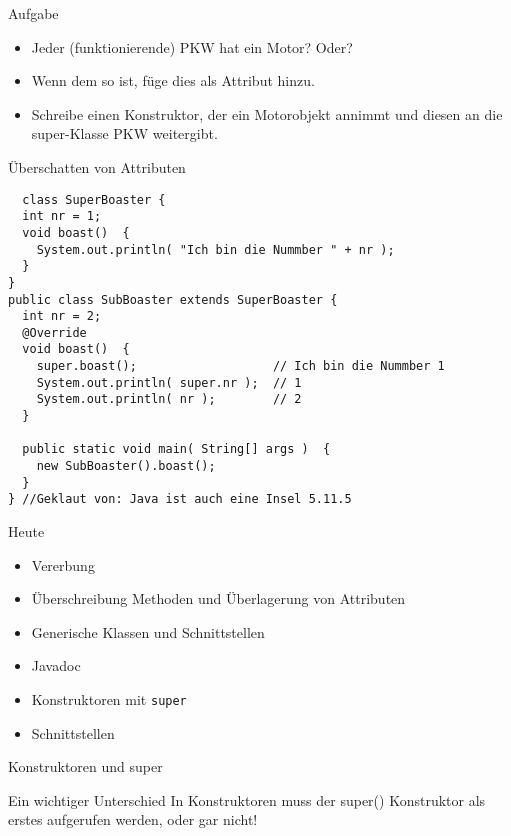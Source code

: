 \documentclass[18pt]{beamer}
\begin{document}
\begin{frame}{Aufgabe}
 \begin{itemize}
  \item Jeder (funktionierende) PKW hat ein Motor? Oder?
  \item Wenn dem so ist, füge dies als Attribut hinzu.
  \item Schreibe einen Konstruktor, der ein Motorobjekt annimmt und diesen an die super-Klasse PKW weitergibt.
 \end{itemize}
\end{frame}

\begin{frame}[fragile]{Überschatten von Attributen}
 \begin{lstlisting}
  class SuperBoaster {
  int nr = 1;
  void boast()  {
    System.out.println( "Ich bin die Nummber " + nr );
  }
}
public class SubBoaster extends SuperBoaster {
  int nr = 2;
  @Override 
  void boast()  {
    super.boast();                   // Ich bin die Nummber 1
    System.out.println( super.nr );  // 1
    System.out.println( nr );        // 2
  }

  public static void main( String[] args )  {
    new SubBoaster().boast();
  }
} //Geklaut von: Java ist auch eine Insel 5.11.5
 \end{lstlisting}
\end{frame}

\begin{frame}[fragile]{Heute}
\begin{itemize}
 \item Vererbung \checkmark
 \item Überschreibung Methoden und Überlagerung von Attributen \checkmark
 \item Generische Klassen und Schnittstellen
 \item Javadoc
 \item Konstruktoren mit \verb|super|

 \item Schnittstellen 
\end{itemize}
\end{frame}

\begin{frame}{Konstruktoren und super}
 \begin{alertblock}{Ein wichtiger Unterschied}
  In Konstruktoren muss der super() Konstruktor als erstes aufgerufen werden,
  oder gar nicht!
 \end{alertblock}
\end{frame}
\end{document}
